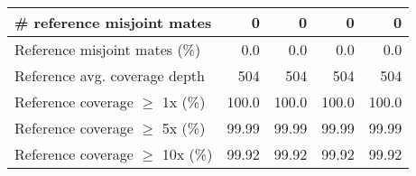 \documentclass[12pt,a4paper]{article}
\begin{document}
\begin{table}[ht]
\begin{center}
\begin{tabular}{|l*{4}{|r}|}
\# reference misjoint mates & 0 & 0 & 0 & 0 \\ \hline
Reference misjoint mates (\%) & 0.0 & 0.0 & 0.0 & 0.0 \\ \hline
Reference avg. coverage depth & 504 & 504 & 504 & 504 \\ \hline
Reference coverage $\geq$ 1x (\%) & 100.0 & 100.0 & 100.0 & 100.0 \\ \hline
Reference coverage $\geq$ 5x (\%) & 99.99 & 99.99 & 99.99 & 99.99 \\ \hline
Reference coverage $\geq$ 10x (\%) & 99.92 & 99.92 & 99.92 & 99.92 \\ \hline
\end{tabular}
\end{center}
\end{table}
\end{document}
